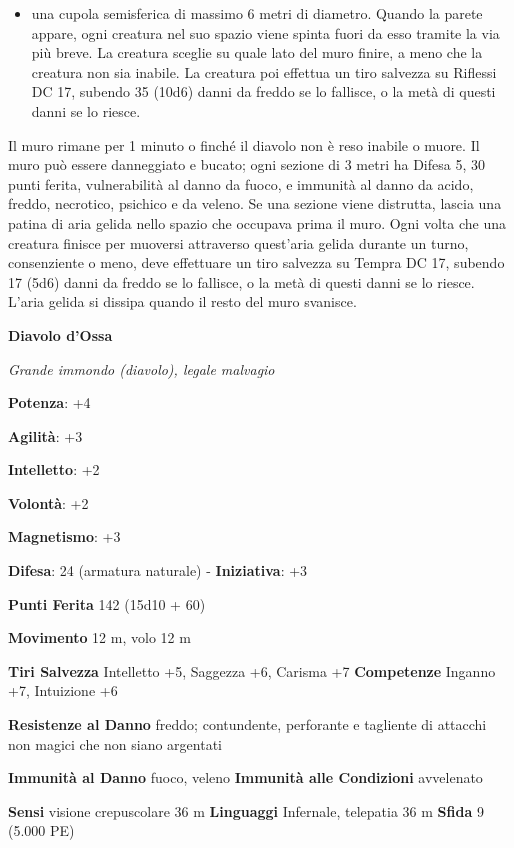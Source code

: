 \begin{multicols}{2}
\begin{itemize}
\item
  una cupola semisferica di massimo 6 metri di diametro. Quando la
  parete appare, ogni creatura nel suo spazio viene spinta fuori da esso
  tramite la via più breve. La creatura sceglie su quale lato del muro
  finire, a meno che la creatura non sia inabile. La creatura poi
  effettua un tiro salvezza su Riflessi DC 17, subendo 35 (10d6) danni
  da freddo se lo fallisce, o la metà di questi danni se lo riesce.
\end{itemize}


Il muro rimane per 1 minuto o finché il diavolo non è reso inabile o
muore. Il muro può essere danneggiato e bucato; ogni sezione di 3 metri
ha Difesa 5, 30 punti ferita, vulnerabilità al danno da fuoco, e immunità al
danno da acido, freddo, necrotico, psichico e da veleno. Se una sezione
viene distrutta, lascia una patina di aria gelida nello spazio che
occupava prima il muro. Ogni volta che una creatura finisce per muoversi
attraverso quest'aria gelida durante un turno, consenziente o meno, deve
effettuare un tiro salvezza su Tempra DC 17, subendo 17 (5d6)
danni da freddo se lo fallisce, o la metà di questi danni se lo riesce.
L'aria gelida si dissipa quando il resto del muro svanisce.


\textbf{Diavolo d'Ossa}

\emph{Grande immondo (diavolo), legale malvagio}

\textbf{Potenza}: +4

\textbf{Agilità}: +3

\textbf{Intelletto}: +2

\textbf{Volontà}: +2

\textbf{Magnetismo}: +3

\textbf{Difesa}: 24 (armatura naturale) - \textbf{Iniziativa}: +3

\textbf{Punti Ferita} 142 (15d10 + 60)

\textbf{Movimento} 12 m, volo 12 m

\textbf{Tiri Salvezza} Intelletto +5, Saggezza +6, Carisma +7
\textbf{Competenze} Inganno +7, Intuizione +6

\textbf{Resistenze al Danno} freddo; contundente, perforante e tagliente
di attacchi non magici che non siano argentati

\textbf{Immunità al Danno} fuoco, veleno \textbf{Immunità alle
Condizioni} avvelenato

\textbf{Sensi} visione crepuscolare 36 m
\textbf{Linguaggi} Infernale, telepatia 36 m \textbf{Sfida} 9 (5.000 PE)


\end{multicols}
